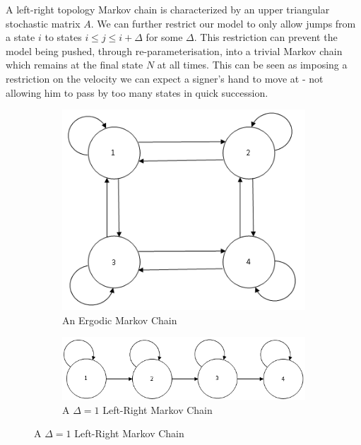 A left-right topology Markov chain is characterized by an upper triangular stochastic matrix $A$. We can further restrict our model to only allow jumps from a state $i$ to states $i \leq j \leq i+\Delta$ for some $\Delta$. This restriction can prevent the model being pushed, through re-parameterisation, into a trivial Markov chain which remains at the final state $N$ at all times. This can be seen as imposing a restriction on the velocity we can expect a signer's hand to move at - not allowing him to pass by too many states in quick succession.

\begin{figure} [h!]
        \centering
        \begin{subfigure}[b]{0.5\textwidth}
                \centering
                \includegraphics[width=1.0\textwidth]{ThesisFigs/erdogicMC}
                \caption{An Ergodic Markov Chain}
                \label{fig:unclust}
        \end{subfigure} 
        \begin{subfigure}[b]{0.5\textwidth}
                \centering
                \includegraphics[width=1.0\textwidth]{ThesisFigs/del1LRMC}
                \caption{A $\Delta = 1$ Left-Right Markov Chain}

\end{subfigure}
\end{figure}
